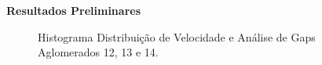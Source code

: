 \documentclass[xcolor=dvipsnames,10pt]{beamer}
\begin{document}
\begin{frame}{\textbf{Resultados Preliminares}}
\begin{figure}[!htbp]
    \caption{Histograma Distribuição de Velocidade e Análise de Gaps Aglomerados 12, 13 e 14.}
  \end{figure}
\end{frame}
\end{document}
